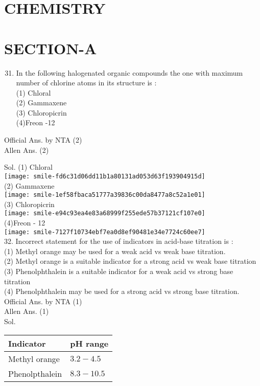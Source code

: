 \documentclass[10pt]{article}
\begin{document}
\captionsetup{singlelinecheck=false}
\section*{CHEMISTRY}
\section*{SECTION-A}
\begin{enumerate}
  \setcounter{enumi}{30}
  \item In the following halogenated organic compounds the one with maximum number of chlorine atoms in its structure is :\\
(1) Chloral\\
(2) Gammaxene\\
(3) Chloropicrin\\
(4)Freon -12
\end{enumerate}

Official Ans. by NTA (2)\\
Allen Ans. (2)

Sol. (1) Chloral\\
\texttt{[image: smile-fd6c31d06dd11b1a80131ad053d63f193904915d]}\\
(2) Gammaxene\\
\texttt{[image: smile-1ef58fbaca51777a39836c00da8477a8c52a1e01]}\\
(3) Chloropicrin\\
\texttt{[image: smile-e94c93ea4e83a68999f255ede57b37121cf107e0]}\\
(4)Freon - 12\\
\texttt{[image: smile-7127f10734ebf7ea0d8ef90481e34e7724c60ee7]}\\
32. Incorrect statement for the use of indicators in acid-base titration is :\\
(1) Methyl orange may be used for a weak acid vs weak base titration.\\
(2) Methyl orange is a suitable indicator for a strong acid vs weak base titration\\
(3) Phenolphthalein is a suitable indicator for a weak acid vs strong base titration\\
(4) Phenolphthalein may be used for a strong acid vs strong base titration.\\
Official Ans. by NTA (1)\\
Allen Ans. (1)\\
Sol.

\begin{center}
\begin{tabular}{|l|l|}
\hline
Indicator & pH range \\
\hline
Methyl orange & \(3.2-4.5\) \\
\hline
Phenolpthalein & \(8.3-10.5\) \\
\hline
\end{tabular}
\end{center}
\end{document}
